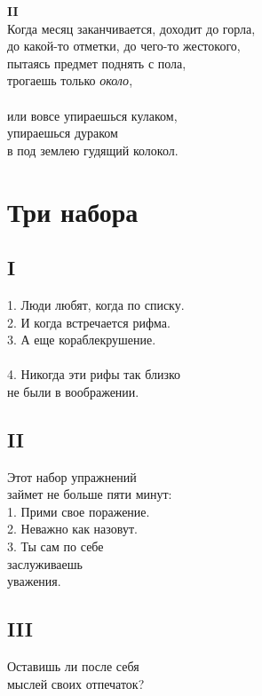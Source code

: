\documentclass[12pt,a5paper]{report}
\begin{document}
\textbf{II}\\

Когда месяц заканчивается, доходит до горла,\\
до какой-то отметки, до чего-то жестокого,\\
пытаясь предмет поднять с пола,\\
трогаешь только \emph{около},\\
\\
или вовсе упираешься кулаком,\\
упираешься дураком\\ %
в под землею гудящий колокол.\\



\section{Три набора}
\subsection[По списку]{I}

1. Люди любят, когда по списку.\\
2. И когда встречается рифма.\\
3. А еще кораблекрушение.\\
\\
4. Никогда эти рифы так близко \\
не были в воображении.

\subsection[Набор упражнений]{II}
Этот набор упражнений\\
займет не больше пяти минут:\\

1. Прими свое поражение.\\
2. Неважно как назовут.\\
3. Ты сам по себе\\
заслуживаешь\\
уважения.\\

\subsection[Отпечаток]{III}
Оставишь ли после себя\\
мыслей своих отпечаток?\\
\end{document}
